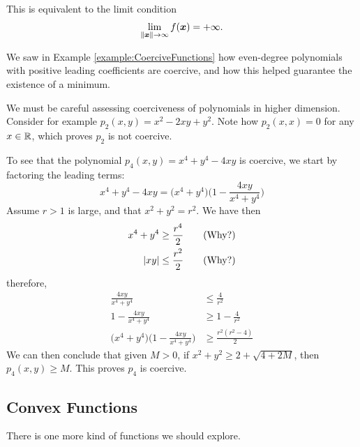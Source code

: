 \begin{remark}
This is equivalent to the limit condition  
\begin{equation*}
\lim_{\lVert \boldsymbol{x} \rVert\to \infty} f(\boldsymbol{x}) = +\infty.
\end{equation*}
\end{remark}

\begin{example}\label{example:CoerciveFunctionsGeneral}
We saw in Example \ref{example:CoerciveFunctions} how even-degree polynomials with positive leading coefficients are coercive, and how this helped guarantee the existence of a minimum.

We must be careful assessing coerciveness of polynomials in higher dimension. Consider for example $p_2(x,y) = x^2 - 2xy + y^2$.  Note how $p_2(x,x)=0$ for any $x \in \mathbb{R}$, which proves $p_2$ is not coercive.

To see that the polynomial $p_4(x, y) = x^4 + y^4 - 4xy$ is coercive, we start by factoring the leading terms:
\begin{equation*}
x^4 + y^4 - 4xy = \big( x^4 + y^4 \big) \bigg( 1 - \frac{4xy}{x^4 + y^4} \bigg)
\end{equation*}
Assume $r>1$ is large, and that $x^2+y^2 = r^2$.  We have then
\begin{align*}
x^4 + y^4 &\geq \frac{r^4}{2} \qquad\text{(Why?)} \\
 \lvert x y \rvert &\leq \frac{r^2}{2} \qquad\text{(Why?)}
\end{align*}
therefore, 
\begin{align*}
\frac{4xy}{x^4 + y^4} &\leq \frac{4}{r^2} \\
1 - \frac{4xy}{x^4 + y^4} &\geq 1 - \frac{4}{r^2} \\
\big( x^4 + y^4 \big) \bigg( 1 - \frac{4 x y}{x^4 + y^4} \bigg) &\geq \frac{r^2(r^2-4)}{2}
\end{align*} 
We can then conclude that given $M>0$, if $x^2+y^2 \geq  2+\sqrt{4+2M}$, then $p_4(x,y) \geq M$.  This proves $p_4$ is coercive.
\end{example}

\subsection{Convex Functions}

There is one more kind of functions we should explore.

